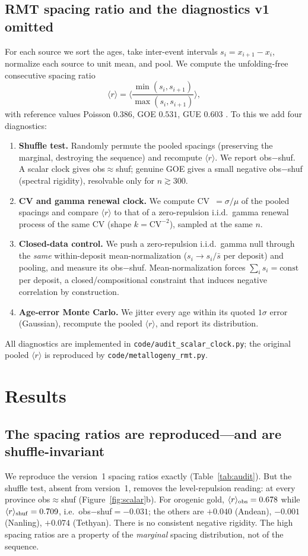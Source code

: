 \documentclass[12pt,a4paper]{article}
\newcommand{\rbar}{\langle r\rangle}
\begin{document}
\subsection{RMT spacing ratio and the diagnostics v1 omitted}
For each source we sort the ages, take inter-event intervals
$s_i=x_{i+1}-x_i$, normalize each source to unit mean, and pool. We compute the
unfolding-free consecutive spacing ratio
\begin{equation}
\rbar=\Big\langle \frac{\min(s_i,s_{i+1})}{\max(s_i,s_{i+1})}\Big\rangle ,
\end{equation}
with reference values Poisson $0.386$, GOE $0.531$, GUE $0.603$
\citep{oganesyan2007,atas2013}. To this we add four diagnostics:
\begin{enumerate}
\item \textbf{Shuffle test.} Randomly permute the pooled spacings (preserving the
marginal, destroying the sequence) and recompute $\rbar$. We report
obs$-$shuf. A scalar clock gives obs$\approx$shuf; genuine GOE gives a small
negative obs$-$shuf (spectral rigidity), resolvable only for $n\gtrsim300$.
\item \textbf{CV and gamma renewal clock.} We compute CV~$=\sigma/\mu$ of the
pooled spacings and compare $\rbar$ to that of a zero-repulsion i.i.d.\ gamma
renewal process of the same CV (shape $k=\mathrm{CV}^{-2}$), sampled at the same
$n$.
\item \textbf{Closed-data control.} We push a zero-repulsion i.i.d.\ gamma null
through the \emph{same} within-deposit mean-normalization ($s_i\to s_i/\bar s$ per
deposit) and pooling, and measure its obs$-$shuf. Mean-normalization forces
$\sum_i s_i=\text{const}$ per deposit, a closed/compositional constraint that
induces negative correlation by construction.
\item \textbf{Age-error Monte Carlo.} We jitter every age within its quoted
$1\sigma$ error (Gaussian), recompute the pooled $\rbar$, and report its
distribution.
\end{enumerate}
All diagnostics are implemented in \texttt{code/audit\_scalar\_clock.py}; the
original pooled $\rbar$ is reproduced by \texttt{code/metallogeny\_rmt.py}.

\section{Results}

\subsection{The spacing ratios are reproduced---and are shuffle-invariant}
We reproduce the version~1 spacing ratios exactly (Table~\ref{tab:audit}). But the
shuffle test, absent from version~1, removes the level-repulsion reading: at every
province obs$\approx$shuf (Figure~\ref{fig:scalar}b). For orogenic gold,
$\rbar_{\rm obs}=0.678$ while $\rbar_{\rm shuf}=0.709$, i.e.\ obs$-$shuf$=-0.031$;
the others are $+0.040$ (Andean), $-0.001$ (Nanling), $+0.074$ (Tethyan). There is
no consistent negative rigidity. The high spacing ratios are a property of the
\emph{marginal} spacing distribution, not of the sequence.
\end{document}
